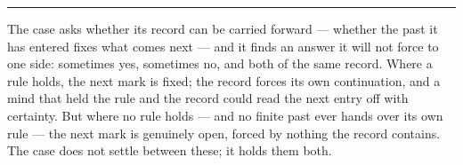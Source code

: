 %
%
%
%

\bigskip
\begin{center}
\rule{0.4\textwidth}{0.4pt}
\end{center}
\bigskip

\noindent The case asks whether its record can be carried forward --- whether the past it has entered fixes what
comes next --- and it finds an answer it will not force to one side: sometimes yes, sometimes no, and both of
the same record. Where a rule holds, the next mark is fixed; the record forces its own continuation, and a mind
that held the rule and the record could read the next entry off with certainty. But where no rule holds --- and
no finite past ever hands over its own rule --- the next mark is genuinely open, forced by nothing the record
contains. The case does not settle between these; it holds them both.

